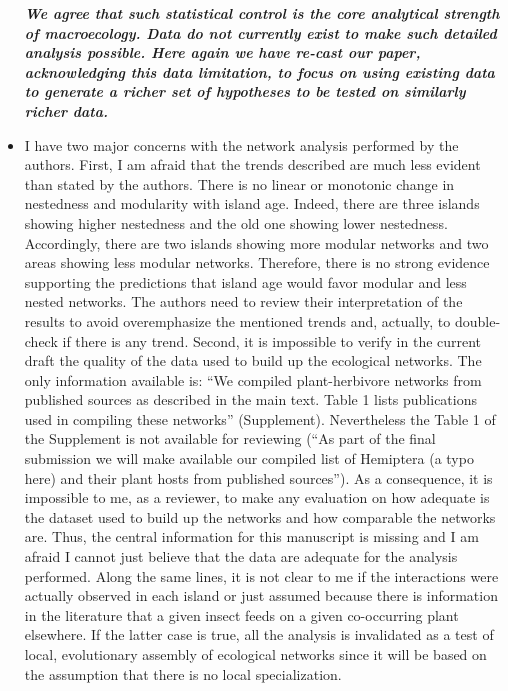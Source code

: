 \documentclass[12pt]{article}
\begin{document}
\begin{itemize}
  \textit{\textbf{We agree that such statistical control is the core
      analytical strength of macroecology. Data do not currently exist
      to make such detailed analysis possible. Here again we have
      re-cast our paper, acknowledging this data limitation, to focus
      on using existing data to generate a richer set of hypotheses to
      be tested on similarly richer data.}}
%
\item I have two major concerns with the network analysis performed by
  the authors. First, I am afraid that the trends described are much
  less evident than stated by the authors. There is no linear or
  monotonic change in nestedness and modularity with island
  age. Indeed, there are three islands showing higher nestedness and
  the old one showing lower nestedness. Accordingly, there are two
  islands showing more modular networks and two areas showing less
  modular networks. Therefore, there is no strong evidence supporting
  the predictions that island age would favor modular and less nested
  networks. The authors need to review their interpretation of the
  results to avoid overemphasize the mentioned trends and, actually,
  to double-check if there is any trend. Second, it is impossible to
  verify in the current draft the quality of the data used to build up
  the ecological networks. The only information available is: ``We
  compiled plant-herbivore networks from published sources as
  described in the main text. Table 1 lists publications used in
  compiling these networks'' (Supplement). Nevertheless the Table 1 of
  the Supplement is not available for reviewing (``As part of the final
  submission we will make available our compiled list of Hemiptera (a
  typo here) and their plant hosts from published sources''). As a
  consequence, it is impossible to me, as a reviewer, to make any
  evaluation on how adequate is the dataset used to build up the
  networks and how comparable the networks are. Thus, the central
  information for this manuscript is missing and I am afraid I cannot
  just believe that the data are adequate for the analysis
  performed. Along the same lines, it is not clear to me if the
  interactions were actually observed in each island or just assumed
  because there is information in the literature that a given insect
  feeds on a given co-occurring plant elsewhere. If the latter case is
  true, all the analysis is invalidated as a test of local,
  evolutionary assembly of ecological networks since it will be based
  on the assumption that there is no local specialization.


\end{itemize}
\end{document}
